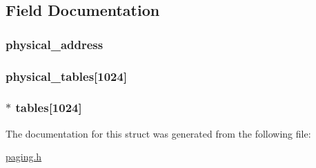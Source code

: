 \subsection{Field Documentation}
\hypertarget{structpage__directory_a598f67da6db982f143737c0353f12e80}{
\subsubsection[{physical\_\-address}]{ {\bf physical\_\-address}}}
\label{structpage__directory_a598f67da6db982f143737c0353f12e80}
\hypertarget{structpage__directory_aaf911c2f3321b2ec2ad793b652da16fa}{
\subsubsection[{physical\_\-tables}]{ {\bf physical\_\-tables}\mbox{[}1024\mbox{]}}}
\label{structpage__directory_aaf911c2f3321b2ec2ad793b652da16fa}
\hypertarget{structpage__directory_a20d9b0b21070dd2f4b7fe1c8058fc238}{
\subsubsection[{tables}]{$\ast$ {\bf tables}\mbox{[}1024\mbox{]}}}
\label{structpage__directory_a20d9b0b21070dd2f4b7fe1c8058fc238}


The documentation for this struct was generated from the following file:\begin{DoxyCompactItemize}
\item 
\hyperlink{paging_8h}{paging.h}\end{DoxyCompactItemize}

